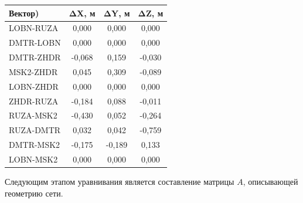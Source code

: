 \begin{table} [htbp]
	\centering\small
	\begin{threeparttable}%
		\label{tab:tab29}
		\setlength{\tabcolsep}{20pt}
		
		\begin{tabular}{ l
				S[table-number-alignment = center]
				S[table-number-alignment = center]
				S[table-number-alignment = center] }
			
			
			\toprule
			\textbf{Вектор)}			& \textbf{ΔX, м}	& \textbf{ΔY, м}	& \textbf{ΔZ, м}	\\ \midrule
			LOBN-RUZA					&  0,000		&  0,000		&  0,000		\\ %
			DMTR-LOBN					&  0,000		&  0,000		&  0,000		\\ %
			DMTR-ZHDR					& -0,068 		&  0,159		& -0,030		\\ %
			MSK2-ZHDR					&  0,045		&  0,309		& -0,089		\\ %
			LOBN-ZHDR					&  0,000		&  0,000		&  0,000		\\ %
			ZHDR-RUZA					& -0,184 		&  0,088		& -0,011		\\ %
			RUZA-MSK2					& -0,430		&  0,052		& -0,264		\\ %
			RUZA-DMTR					&  0,032		&  0,042		& -0,759		\\ %
			DMTR-MSK2					& -0,175 		& -0,189 		&  0,133		\\ %
			LOBN-MSK2					&  0,000 		&  0,000		&  0,000		\\ \bottomrule
		\end{tabular}
		
	\end{threeparttable}
\end{table}

\newpage

Следующим этапом уравнивания является составление матрицы $A$, описывающей геометрию сети. 

\newcommand{\ph}[1]{\phantom{#1}}
\newcommand{\phmb}[1]{\ph{\boldsymbol{#1}}}
\newcommand{\phm}{\phmb{-}}
\newcommand{\mbs}[1]{\boldsymbol{#1}}
\newcommand{\fit}{DDD}


